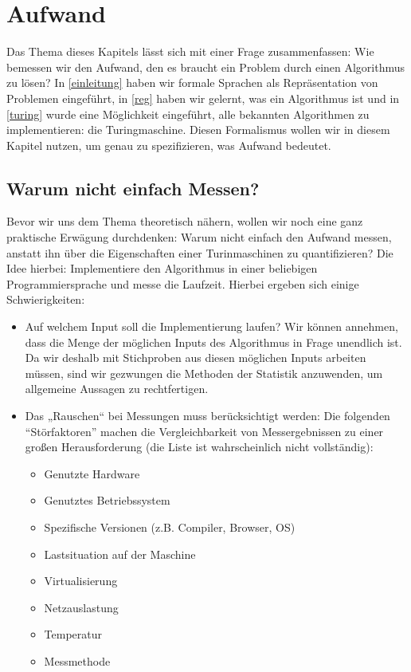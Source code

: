 \chapter{Aufwand}


Das Thema dieses Kapitels lässt sich mit einer Frage zusammenfassen:
Wie bemessen wir den Aufwand,
den es braucht ein Problem durch einen Algorithmus zu lösen?
In \autoref{einleitung} haben wir formale Sprachen als Repräsentation von Problemen eingeführt,
in \autoref{reg} haben wir gelernt, was ein Algorithmus ist und
in \autoref{turing} wurde eine Möglichkeit eingeführt,
alle bekannten Algorithmen zu implementieren:
die Turingmaschine.
Diesen Formalismus wollen wir in diesem Kapitel nutzen,
um genau zu spezifizieren,
was Aufwand bedeutet.

\section{Warum nicht einfach Messen?}\label{messenVsBeweisen}

Bevor wir uns dem Thema theoretisch nähern,
wollen wir noch eine ganz praktische Erwägung durchdenken:
Warum nicht einfach den Aufwand messen,
anstatt ihn über die Eigenschaften einer Turinmaschinen zu quantifizieren?
Die Idee hierbei:
Implementiere den Algorithmus in einer beliebigen Programmiersprache
und messe die Laufzeit.
Hierbei ergeben sich einige Schwierigkeiten:
\begin{itemize}
  \item Auf welchem Input soll die Implementierung laufen?
      Wir können annehmen, dass die Menge der möglichen Inputs des Algorithmus in Frage unendlich ist.
      Da wir deshalb mit Stichproben aus diesen möglichen Inputs arbeiten müssen,
      sind wir gezwungen die Methoden der Statistik anzuwenden,
        um allgemeine Aussagen zu rechtfertigen.
    \item Das „Rauschen“ bei Messungen muss berücksichtigt werden:
        Die folgenden ``Störfaktoren'' machen
        die Vergleichbarkeit von Messergebnissen zu einer
        großen Herausforderung (die Liste ist wahrscheinlich nicht vollständig):
      \begin{itemize}
          \item Genutzte Hardware
          \item Genutztes Betriebssystem
          \item Spezifische Versionen (z.B. Compiler, Browser, OS)
          \item Lastsituation auf der Maschine
          \item Virtualisierung
          \item Netzauslastung
          \item Temperatur
          \item Messmethode
      \end{itemize}
\end{itemize}

